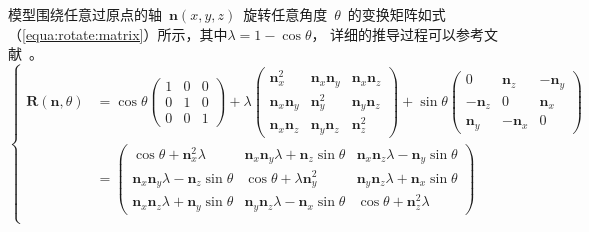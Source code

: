模型围绕任意过原点的轴~$\bm{n}(x, y,
z)$~旋转任意角度~$\theta$~的变换矩阵如式（\ref{equa:rotate:matrix}）所示，其中$\lambda
= 1-\cos\theta$，
详细的推导过程可以参考文献~。
\begin{equation}
\left\{
    \begin{array}{ll}
    \bm{R}(\bm{n},\theta) 
    &= 
          \cos\theta \begin{pmatrix}
                      1 & 0 & 0 \\
                      0 & 1 & 0 \\
                      0 & 0 & 1
                     \end{pmatrix}
          + \lambda \begin{pmatrix}
                    \bm{n}_x^2 & \bm{n}_x\bm{n}_y & \bm{n}_x\bm{n}_z \\
                    \bm{n}_x\bm{n}_y & \bm{n}_y^2 & \bm{n}_y\bm{n}_z \\
                    \bm{n}_x\bm{n}_z & \bm{n}_y\bm{n}_z & \bm{n}_z^2 
                    \end{pmatrix}
          + \sin\theta \begin{pmatrix}
                      0 & \bm{n}_z & -\bm{n}_y \\
                      -\bm{n}_z & 0 & \bm{n}_x \\
                      \bm{n}_y & -\bm{n}_x & 0
                      \end{pmatrix}
          \\
    ~&=  
        \begin{pmatrix}
              \cos\theta+\bm{n}_x^2\lambda & \bm{n}_x\bm{n}_y\lambda + \bm{n}_z\sin\theta & \bm{n}_x\bm{n}_z\lambda-\bm{n}_y\sin\theta \\
              \bm{n}_x\bm{n}_y\lambda - \bm{n}_z\sin\theta & \cos\theta+\lambda\bm{n}_y^2 & \bm{n}_y\bm{n}_z\lambda+\bm{n}_x\sin\theta \\
              \bm{n}_x\bm{n}_z\lambda + \bm{n}_y\sin\theta & \bm{n}_y\bm{n}_z\lambda - \bm{n}_x\sin\theta &  \cos\theta+\bm{n}_z^2\lambda 
          \end{pmatrix} \\
  \end{array}
\right.
\label{equa:rotate:matrix}
\end{equation}

